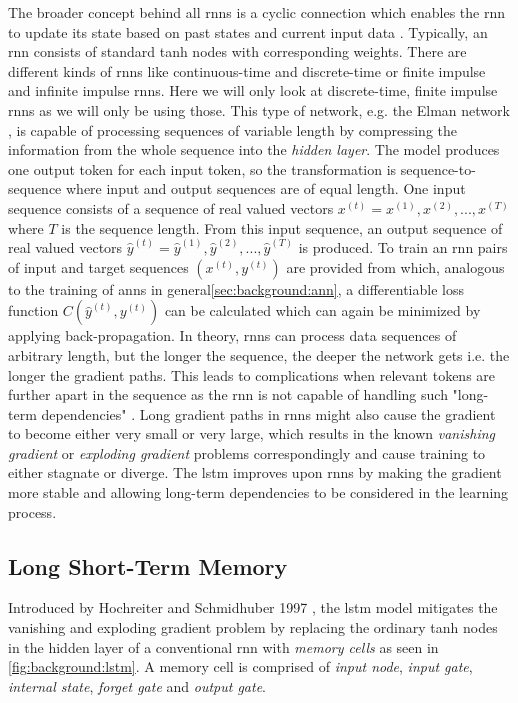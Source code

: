 The broader concept behind all \glspl{rnn} is a cyclic connection which enables the \gls{rnn} to update its state based on past states and current input data \cite{rnn_review}. Typically, an \gls{rnn} consists of standard tanh nodes with corresponding weights. There are different kinds of \glspl{rnn} like continuous-time and discrete-time or finite impulse and infinite impulse \glspl{rnn}. Here we will only look at discrete-time, finite impulse \glspl{rnn} as we will only be using those. This type of network, e.g. the Elman network \cite{rnn_elman}, is capable of processing sequences of variable length by compressing the information from the whole sequence into the \textit{hidden layer}.  The model produces one output token for each input token, so the transformation is sequence-to-sequence where input and output sequences are of equal length. One input sequence consists of a sequence of real valued vectors $x^{(t)} = x^{(1)}, x^{(2)}, ... , x^{(T)}$ where $T$ is the sequence length. From this input sequence, an output sequence of real valued vectors $\hat{y}^{(t)} = \hat{y}^{(1)}, \hat{y}^{(2)}, ... , \hat{y}^{(T)}$ is produced. To train an \gls{rnn} 
pairs of input and target sequences $(x^{(t)}, y^{(t)})$ are provided from which, analogous to the training of \glspl{ann} in general\ref{sec:background:ann}, a differentiable loss function $C(\hat{y}^{(t)}, y^{(t)})$ can be calculated which can again be minimized by applying back-propagation. In theory, \glspl{rnn} can process data sequences of arbitrary length, but the longer the sequence, the deeper the network gets i.e. the longer the gradient paths. This leads to complications when relevant tokens are further apart in the sequence as the \gls{rnn} is not capable of handling such "long-term dependencies" \cite{rnn_review}. Long gradient paths in \glspl{rnn} might also cause the gradient to become either very small or very large, which results in the known \textit{vanishing gradient} or \textit{exploding gradient} problems correspondingly and cause training to either stagnate or diverge. The \gls{lstm} improves upon \glspl{rnn} by making the gradient more stable and allowing long-term dependencies to be considered in the learning process.

\subsection{Long Short-Term Memory}

Introduced by Hochreiter and Schmidhuber 1997 \cite{lstm_origin}, the \gls{lstm} model mitigates the vanishing and exploding gradient problem by replacing the ordinary tanh nodes in the hidden layer of a conventional \gls{rnn} with \textit{memory cells} as seen in \ref{fig:background:lstm}. 
A memory cell is comprised of \textit{input node}, \textit{input gate}, \textit{internal state}, \textit{forget gate} and \textit{output gate}. 

